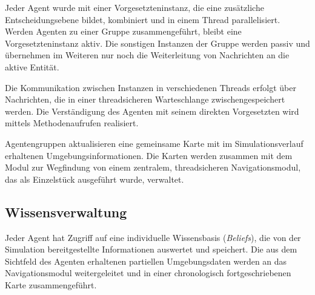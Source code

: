 \documentclass[runningheads]{llncs}
\begin{document}
	Jeder Agent wurde mit einer Vorgesetzteninstanz, die eine zusätzliche Entscheidungsebene bildet, kombiniert und in einem Thread parallelisiert. Werden Agenten zu einer Gruppe zusammengeführt, bleibt eine Vorgesetzteninstanz aktiv. Die sonstigen Instanzen der Gruppe werden passiv und übernehmen im Weiteren nur noch die Weiterleitung von Nachrichten an die aktive Entität.
	
	Die Kommunikation zwischen Instanzen in verschiedenen Threads erfolgt über Nachrichten, die in einer threadsicheren Warteschlange zwischengespeichert werden. Die Verständigung des Agenten mit seinem direkten Vorgesetzten wird mittels Methodenaufrufen realisiert.
	
	Agentengruppen aktualisieren eine gemeinsame Karte mit im Simulationsverlauf erhaltenen Umgebungsinformationen. Die Karten werden zusammen mit dem Modul zur Wegfindung von einem zentralem, threadsicheren Navigationsmodul, das als Einzelstück ausgeführt wurde, verwaltet. 
	
	
	\subsection{Wissensverwaltung}\label{wissensverwaltung}
	Jeder Agent hat Zugriff auf eine individuelle Wissensbasis (\textit{Beliefs}), die von der Simulation bereitgestellte Informationen auswertet und speichert.
	Die aus dem Sichtfeld des Agenten erhaltenen partiellen Umgebungsdaten werden an das Navigationsmodul weitergeleitet und in einer chronologisch fortgeschriebenen Karte zusammengeführt.
	
\end{document}
